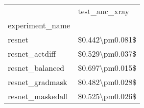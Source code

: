 \begin{tabular}{ll}
\toprule
{} &    test\_auc\_xray \\
experiment\_name     &                  \\
\midrule
resnet              &  \$0.442\textbackslash pm0.081\$ \\
resnet\_actdiff      &  \$0.529\textbackslash pm0.037\$ \\
resnet\_balanced     &  \$0.697\textbackslash pm0.015\$ \\
resnet\_gradmask     &  \$0.482\textbackslash pm0.028\$ \\
resnet\_maskedall    &  \$0.525\textbackslash pm0.026\$ \\
\bottomrule
\end{tabular}
